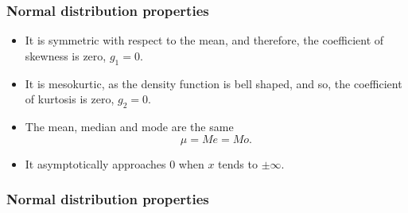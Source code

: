 \begin{frame}
\frametitle{Normal distribution properties}
\begin{itemize}
\item It is symmetric with respect to the mean, and therefore, the coefficient of skewness is zero,
$g_1=0$.
\item It is mesokurtic, as the density function is bell shaped, and so, the coefficient of kurtosis is zero, $g_2=0$.
\item The mean, median and mode are the same
\[
\mu = Me = Mo.
\]
\item It asymptotically approaches 0 when $x$ tends to $\pm \infty$.
\end{itemize}
\end{frame}


\begin{frame}
\frametitle{Normal distribution properties}
\begin{center}
\\
\\
\end{center}

\begin{center}
\end{center}
\end{frame}


